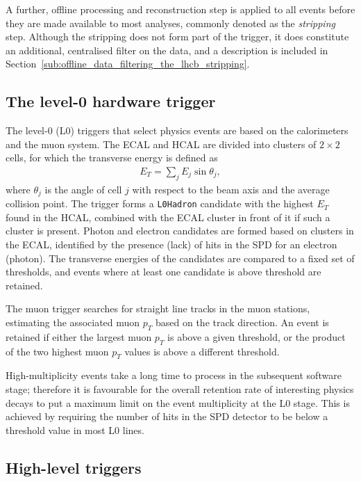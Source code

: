 A further, offline processing and reconstruction step is applied to all events before they are made available to most \lhcb analyses, commonly denoted as the \emph{stripping} step. Although the stripping does not form part of the \lhcb trigger, it does constitute an additional, centralised filter on the data, and a description is included in Section~\ref{sub:offline_data_filtering_the_lhcb_stripping}.



\subsection{The level-0 hardware trigger} %
\label{sub:the_level_0_hardware_trigger}

The level-0 (L0) triggers that select physics events are based on the calorimeters and the muon system. 
The ECAL and HCAL are divided into clusters of $2\times2$ cells, for which the transverse energy is defined as
\begin{align}
    E_T=\sum_{j} E_j \sin \theta_j,
\end{align}
where $\theta_j$ is the angle of cell $j$ with respect to the beam axis and the average collision point. The trigger forms a \texttt{L0Hadron} candidate with the highest $E_T$ found in the HCAL, combined with the ECAL cluster in front of it if such a cluster is present. Photon and electron candidates are formed based on clusters in the ECAL, identified by the presence (lack) of hits in the SPD for an electron (photon). The transverse energies of the candidates are compared to a fixed set of thresholds, and events where at least one candidate is above threshold are retained.

The muon trigger searches for straight line tracks in the muon stations, estimating the associated muon $p_T$ based on the track direction. An event is retained if either the largest muon $p_T$ is above a given threshold, or the product of the two highest muon $p_T$ values is above a different threshold.

High-multiplicity events take a long time to process in the subsequent software stage; therefore it is favourable for the overall retention rate of interesting physics decays to put a maximum limit on the event multiplicity at the L0 stage. This is achieved by requiring the number of hits in the SPD detector to be below a threshold value in most L0 lines.


\subsection{High-level triggers} %
\label{sub:high_level_triggers}

